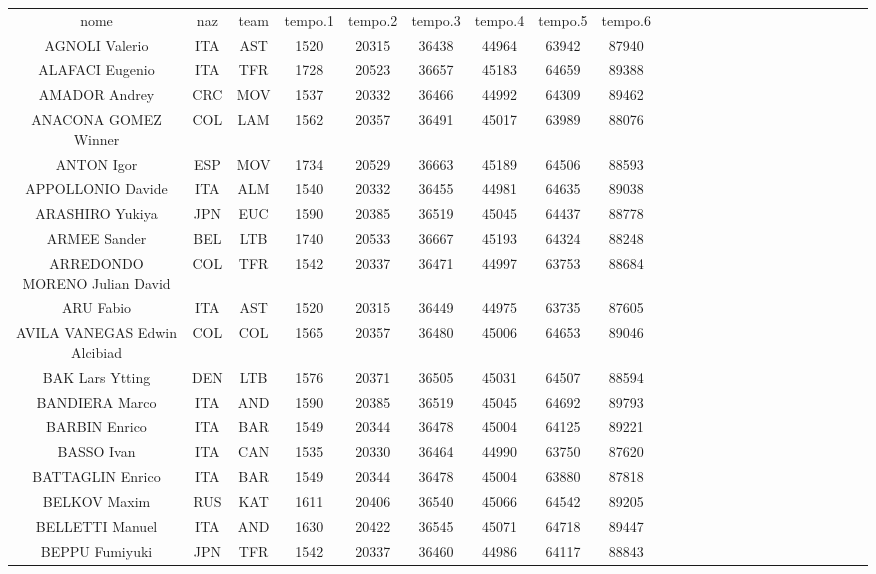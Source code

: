 \documentclass[10pt]{article}
\begin{document}
\begin{table}
\begin{tabular}{c c c c c c c c c c c c c c c c c c c c c c c c}
\hline
 nome & naz &  team &  tempo.1 &  tempo.2 &  tempo.3 &  tempo.4 &  tempo.5 &  tempo.6 \\
 AGNOLI Valerio & ITA &  AST &  1520 &  20315 &  36438 &  44964 &  63942 &  87940 \\
 ALAFACI Eugenio & ITA &  TFR &  1728 &  20523 &  36657 &  45183 &  64659 &  89388 \\
 AMADOR Andrey & CRC &  MOV &  1537 &  20332 &  36466 &  44992 &  64309 &  89462 \\
 ANACONA GOMEZ Winner & COL &  LAM &  1562 &  20357 &  36491 &  45017 &  63989 &  88076 \\
 ANTON Igor & ESP &  MOV &  1734 &  20529 &  36663 &  45189 &  64506 &  88593 \\
 APPOLLONIO Davide & ITA &  ALM &  1540 &  20332 &  36455 &  44981 &  64635 &  89038 \\
 ARASHIRO Yukiya & JPN &  EUC &  1590 &  20385 &  36519 &  45045 &  64437 &  88778 \\
 ARMEE Sander & BEL &  LTB &  1740 &  20533 &  36667 &  45193 &  64324 &  88248 \\
 ARREDONDO MORENO Julian David & COL &  TFR &  1542 &  20337 &  36471 &  44997 &  63753 &  88684 \\
 ARU Fabio & ITA &  AST &  1520 &  20315 &  36449 &  44975 &  63735 &  87605 \\
 AVILA VANEGAS Edwin Alcibiad & COL &  COL &  1565 &  20357 &  36480 &  45006 &  64653 &  89046 \\
 BAK Lars Ytting & DEN &  LTB &  1576 &  20371 &  36505 &  45031 &  64507 &  88594 \\
 BANDIERA Marco & ITA &  AND &  1590 &  20385 &  36519 &  45045 &  64692 &  89793 \\
 BARBIN Enrico & ITA &  BAR &  1549 &  20344 &  36478 &  45004 &  64125 &  89221 \\
 BASSO Ivan & ITA &  CAN &  1535 &  20330 &  36464 &  44990 &  63750 &  87620 \\
 BATTAGLIN Enrico & ITA &  BAR &  1549 &  20344 &  36478 &  45004 &  63880 &  87818 \\
 BELKOV Maxim & RUS &  KAT &  1611 &  20406 &  36540 &  45066 &  64542 &  89205 \\
 BELLETTI Manuel & ITA &  AND &  1630 &  20422 &  36545 &  45071 &  64718 &  89447 \\
 BEPPU Fumiyuki & JPN &  TFR &  1542 &  20337 &  36460 &  44986 &  64117 &  88843 \\

\end{tabular}
\end{table}
\end{document}
